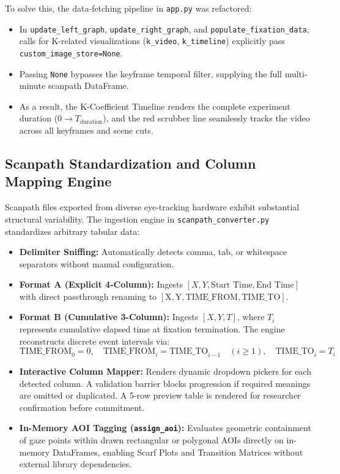 \documentclass[11pt,a4paper]{article}
\begin{document}
To solve this, the data-fetching pipeline in \texttt{app.py} was refactored:
\begin{itemize}[noitemsep,topsep=2pt]
    \item In \texttt{update\_left\_graph}, \texttt{update\_right\_graph}, and \texttt{populate\_fixation\_data}, calls for K-related visualizations (\texttt{k\_video}, \texttt{k\_timeline}) explicitly pass \texttt{custom\_image\_store=None}.
    \item Passing \texttt{None} bypasses the keyframe temporal filter, supplying the full multi-minute scanpath DataFrame.
    \item As a result, the K-Coefficient Timeline renders the complete experiment duration ($0 \to T_{\text{duration}}$), and the red scrubber line seamlessly tracks the video across all keyframes and scene cuts.
\end{itemize}

\subsection{Scanpath Standardization and Column Mapping Engine}
Scanpath files exported from diverse eye-tracking hardware exhibit substantial structural variability. The ingestion engine in \texttt{scanpath\_converter.py} standardizes arbitrary tabular data:
\begin{itemize}[noitemsep,topsep=2pt]
    \item \textbf{Delimiter Sniffing:} Automatically detects comma, tab, or whitespace separators without manual configuration.
    \item \textbf{Format A (Explicit 4-Column):} Ingests $[X, Y, \text{Start Time}, \text{End Time}]$ with direct passthrough renaming to $[\text{X}, \text{Y}, \text{TIME\_FROM}, \text{TIME\_TO}]$.
    \item \textbf{Format B (Cumulative 3-Column):} Ingests $[X, Y, T]$, where $T_i$ represents cumulative elapsed time at fixation termination. The engine reconstructs discrete event intervals via:
    \begin{equation}
        \text{TIME\_FROM}_0 = 0, \quad \text{TIME\_FROM}_i = \text{TIME\_TO}_{i-1} \quad (i \ge 1), \quad \text{TIME\_TO}_i = T_i
    \end{equation}
    \item \textbf{Interactive Column Mapper:} Renders dynamic dropdown pickers for each detected column. A validation barrier blocks progression if required meanings are omitted or duplicated. A 5-row preview table is rendered for researcher confirmation before commitment.
    \item \textbf{In-Memory AOI Tagging (\texttt{assign\_aoi}):} Evaluates geometric containment of gaze points within drawn rectangular or polygonal AOIs directly on in-memory DataFrames, enabling Scarf Plots and Transition Matrices without external library dependencies.
\end{itemize}
\end{document}

